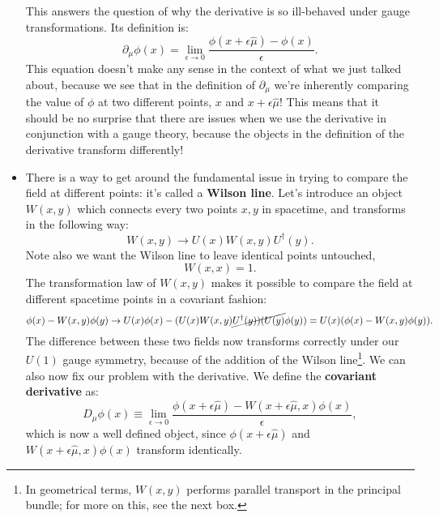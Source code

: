 \documentclass[12pt, oneside]{article}   	%
\theoremstyle{definition}
\begin{document}
\begin{itemize}
	This answers the question of why the derivative is so ill-behaved under gauge transformations. Its definition is:
	\begin{equation}
		\partial_\mu \phi(x) = \lim_{\epsilon\rightarrow 0} \frac{\phi(x + \epsilon \hat{\mu}) - \phi(x)}{\epsilon}.
	\end{equation}
	This equation doesn't make any sense in the context of what we just talked about, because we see that in the definition of $\partial_\mu$ we're inherently comparing the value of $\phi$ at two different points, $x$ and $x + \epsilon \hat{\mu}$! This means that it should be no surprise that there are issues when we use the derivative in conjunction with a gauge theory, because the objects in the definition of the derivative transform differently!
	
	\item There is a way to get around the fundamental issue in trying to compare the field at different points: it's called a \textbf{Wilson line}. Let's introduce an object $W(x, y)$ which connects every two points $x, y$ in spacetime, and transforms in the following way:
	\begin{equation}
		W(x, y) \rightarrow U(x) W(x, y) U^\dagger(y).
	\end{equation}
	Note also we want the Wilson line to leave identical points untouched,
	\begin{equation}
		W(x, x) = 1.
	\end{equation}
	The transformation law of $W(x, y)$ makes it possible to compare the field at different spacetime points in a covariant fashion:
	\begin{equation}
		\phi(x) - W(x, y) \phi(y) \rightarrow U(x) \phi(x) - (U(x) W(x, y) \cancel{U^\dagger(y)) (U(y)} \phi(y)) = U(x) (\phi(x) - W(x, y) \phi(y)). 
	\end{equation}
	The difference between these two fields now transforms correctly under our $U(1)$ gauge symmetry, because of the addition of the Wilson line\footnote{In geometrical terms, $W(x, y)$ performs parallel transport in the principal bundle; for more on this, see the next box.}. We can also now fix our problem with the derivative. We define the \textbf{covariant derivative} as:
	\begin{equation}
		D_\mu\phi(x)\equiv \lim_{\epsilon\rightarrow 0} \frac{\phi(x + \epsilon \hat{\mu}) - W(x + \epsilon \hat{\mu}, x) \phi(x)}{\epsilon},
	\end{equation}
	which is now a well defined object, since $\phi(x + \epsilon\hat{\mu})$ and $W(x + \epsilon\hat{\mu}, x) \phi(x)$ transform identically. 
	

\end{itemize}
\end{document}

